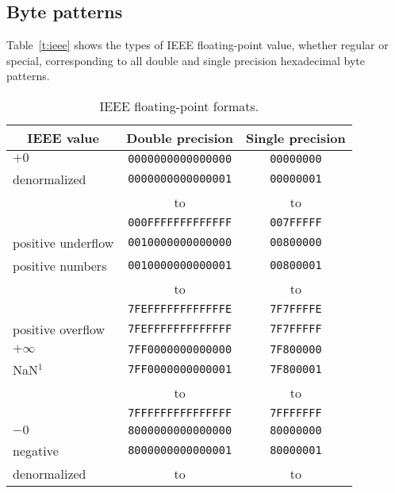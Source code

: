 \documentclass[onecolumn]{aa}
\begin{document}
\subsection{Byte patterns}

 Table~\ref{t:ieee} shows the types of IEEE floating-point value,
 whether regular or special, corresponding to all double and single
 precision hexadecimal byte patterns. 
 
 
\begin{table}
\begin{center}
\caption[IEEE floating-point formats.]{IEEE floating-point formats.}
\begin{tabular}{lcc} 
\hline \hline
\multicolumn{1}{c}{IEEE value} & Double precision 
                                              & Single precision \\
\hline
    $+0$                & {\tt 0000000000000000} & {\tt 00000000} \\
    denormalized        & {\tt 0000000000000001} & {\tt 00000001} \\
                        &             to         &         to     \\
                        & {\tt 000FFFFFFFFFFFFF} & {\tt 007FFFFF} \\
    positive underflow  & {\tt 0010000000000000} & {\tt 00800000} \\
    positive numbers    & {\tt 0010000000000001} & {\tt 00800001} \\
                        &             to         &         to     \\
                        & {\tt 7FEFFFFFFFFFFFFE} & {\tt 7F7FFFFE} \\
    positive overflow   & {\tt 7FEFFFFFFFFFFFFF} & {\tt 7F7FFFFF} \\
    $+\infty$           & {\tt 7FF0000000000000} & {\tt 7F800000} \\
    NaN$^{1}$           & {\tt 7FF0000000000001} & {\tt 7F800001} \\
                        &             to         &         to     \\
                        & {\tt 7FFFFFFFFFFFFFFF} & {\tt 7FFFFFFF} \\
    $-0$                & {\tt 8000000000000000} & {\tt 80000000} \\
    negative            & {\tt 8000000000000001} & {\tt 80000001} \\
     denormalized       &             to         &         to     \\

\end{tabular}
\end{center}
\end{table}
\end{document}
